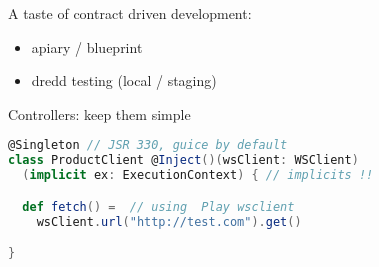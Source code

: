 \documentclass[10pt]{beamer}
\providecommand{\eg}{e.\,g.}
\begin{document}
\begin{frame}
A taste of contract driven development:
\begin{itemize}
\item apiary / blueprint 
\item dredd testing (local / staging) 
\end{itemize}
\end{frame}

\begin{frame}
Controllers: keep them simple 
\end{frame}


\begin{frame}[fragile]
\begin{lstlisting}[language=Scala, basicstyle=\ttfamily]
@Singleton // JSR 330, guice by default 
class ProductClient @Inject()(wsClient: WSClient)  
  (implicit ex: ExecutionContext) { // implicits !! 

  def fetch() =  // using  Play wsclient 
    wsClient.url("http://test.com").get()

}
\end{lstlisting}
\end{frame}




\end{document}
